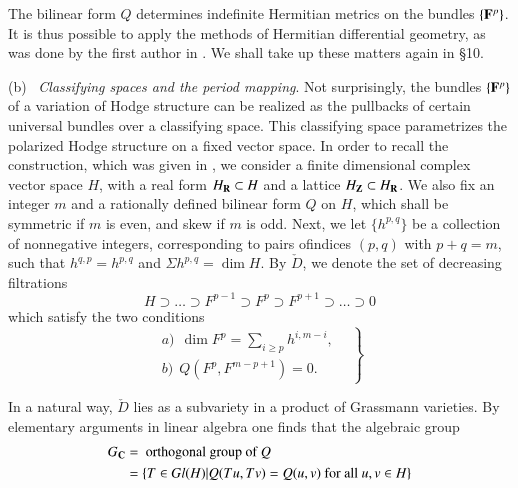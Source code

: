 The bilinear form $Q$ determines indefinite Hermitian metrics on the bundles $\{\mathbf{F}^p\}$. It is thus possible to apply the methods of Hermitian differential geometry, as was done by the first author in \cite{art4-key19}. We shall take up these matters again in \S 10.

\medskip
\noindent
(b)~ \textit{Classifying spaces and the period mapping}. Not surprisingly, the bundles $\{\mathbf{F}^p\}$ of a variation of Hodge structure can be realized as the pullbacks of certain universal bundles over a classifying space. This classifying space parametrizes the polarized Hodge structure on a fixed vector space. In order to recall the construction, which was given in \cite{art4-key18}, we consider a finite dimensional complex vector space $H$, with a real form $H_{\mathbf{R}} \subset H$ and a lattice $H_{\mathbf{Z}} \subset H_{\mathbf{R}}$. We also fix an integer $m$ and a rationally defined bilinear form $Q$ on $H$, which shall be symmetric if $m$ is even, and skew if $m$ is odd. Next, we let $\{h^{p,q}\}$ be a collection of nonnegative integers, corresponding to pairs of\pageoriginale indices $(p,q)$ with $p+q=m$, such that $h^{q,p} = h^{p,q}$ and $\Sigma h^{p,q} = \dim H$. By $\check{D}$, we denote the set of decreasing filtrations
$$
H \supset \ldots \supset F^{p-1} \supset F^p \supset F^{p+1} \supset \ldots \supset 0
$$
which satisfy the two conditions 
\begin{equation}
\left.
\begin{matrix}
a)~~ \dim F^p = \sum_{i \geqslant p} h^{i, m-i},\\[0.2cm]
b)~~ Q (F^p, F^{m-p+1}) = 0.  \quad \quad 
\end{matrix}
\right\} \label{art4-eq3.3}
\end{equation}

In a natural way, $\check{D}$ lies as a subvariety in a product of Grassmann varieties. By elementary arguments in linear algebra one finds that the algebraic group
\begin{align*}
G_{\mathbf{C}} & = \text{ orthogonal group of } Q \notag\\
& = \{T \in Gl (H)| Q (Tu , Tv) = Q (u,v) \text{ for all } u, v \in H \} \label{art4-eq3.4}
\end{align*}






\begin{thebibliography}{99}
\end{thebibliography}





